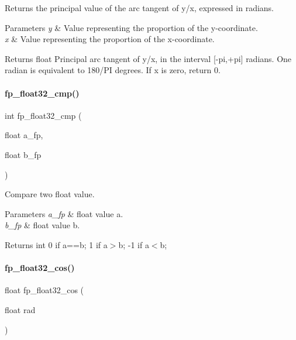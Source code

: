 Returns the principal value of the arc tangent of y/x, expressed in radians. 


\begin{DoxyParams}{Parameters}
{\em y} & Value representing the proportion of the y-\/coordinate. \\
\hline
{\em x} & Value representing the proportion of the x-\/coordinate. \\
\hline
\end{DoxyParams}
\begin{DoxyReturn}{Returns}
float Principal arc tangent of y/x, in the interval \mbox{[}-\/pi,+pi\mbox{]} radians. One radian is equivalent to 180/\+PI degrees. If x is zero, return 0. 
\end{DoxyReturn}
\mbox{\label{a00023_a55ee0ff6cc8f2a97c7079024577d33d3}} 
\paragraph{\texorpdfstring{fp\+\_\+float32\+\_\+cmp()}{fp\_float32\_cmp()}}
{\footnotesize\ttfamily int fp\+\_\+float32\+\_\+cmp (\begin{DoxyParamCaption}\item[{float}]{a\+\_\+fp,  }\item[{float}]{b\+\_\+fp }\end{DoxyParamCaption})}



Compare two float value. 


\begin{DoxyParams}{Parameters}
{\em a\+\_\+fp} & float value a. \\
\hline
{\em b\+\_\+fp} & float value b. \\
\hline
\end{DoxyParams}
\begin{DoxyReturn}{Returns}
int 0 if a==b; 1 if a$>$b; -\/1 if a$<$b; 
\end{DoxyReturn}
\mbox{\label{a00023_a76d63763a1fbbbed015ad39ff22a1a99}} 
\paragraph{\texorpdfstring{fp\+\_\+float32\+\_\+cos()}{fp\_float32\_cos()}}
{\footnotesize\ttfamily float fp\+\_\+float32\+\_\+cos (\begin{DoxyParamCaption}\item[{float}]{rad }\end{DoxyParamCaption})}



